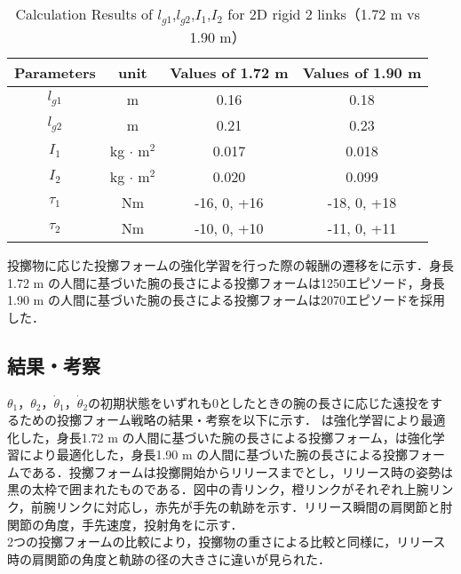 \begin{table}[tb]
  \begin{center}
    \caption{Calculation Results of $l_{g1}$,$l_{g2}$,$I_{1}$,$I_{2}$ for 2D rigid 2 links（1.72 m vs 1.90 m）}
    \begin{tabular}{c|c|c|c}
      \hline
      Parameters & unit & Values of 1.72 m & Values of 1.90 m \\
      \hline
      $l_{g1}$ & m & 0.16 & 0.18 \\
      $l_{g2}$ & m & 0.21 & 0.23 \\
      $I_{1}$ & kg $\cdot$ $\mathrm{m}^2$ & 0.017 & 0.018 \\
      $I_{2}$ & kg $\cdot$ $\mathrm{m}^2$ & 0.020 & 0.099 \\
      $\tau_{1}$ & Nm & -16, 0, +16 & -18, 0, +18 \\
      $\tau_{2}$ & Nm & -10, 0, +10 & -11, 0, +11 \\
      \hline
    \end{tabular}
  \end{center}
\end{table}

投擲物に応じた投擲フォームの強化学習を行った際の報酬の遷移をに示す．身長1.72 m の人間に基づいた腕の長さによる投擲フォームは1250エピソード，身長1.90 m の人間に基づいた腕の長さによる投擲フォームは2070エピソードを採用した．


\subsection{結果・考察}
$\theta_{1}$，$\theta_{2}$，$\dot{\theta}_{1}$，$\dot{\theta}_{2}$の初期状態をいずれも0としたときの腕の長さに応じた遠投をするための投擲フォーム戦略の結果・考察を以下に示す．
は強化学習により最適化した，身長1.72 m の人間に基づいた腕の長さによる投擲フォーム，は強化学習により最適化した，身長1.90 m の人間に基づいた腕の長さによる投擲フォームである．投擲フォームは投擲開始からリリースまでとし，リリース時の姿勢は黒の太枠で囲まれたものである．図中の青リンク，橙リンクがそれぞれ上腕リンク，前腕リンクに対応し，赤先が手先の軌跡を示す．リリース瞬間の肩関節と肘関節の角度，手先速度，投射角をに示す．\\2つの投擲フォームの比較により，投擲物の重さによる比較と同様に，リリース時の肩関節の角度と軌跡の径の大きさに違いが見られた．

